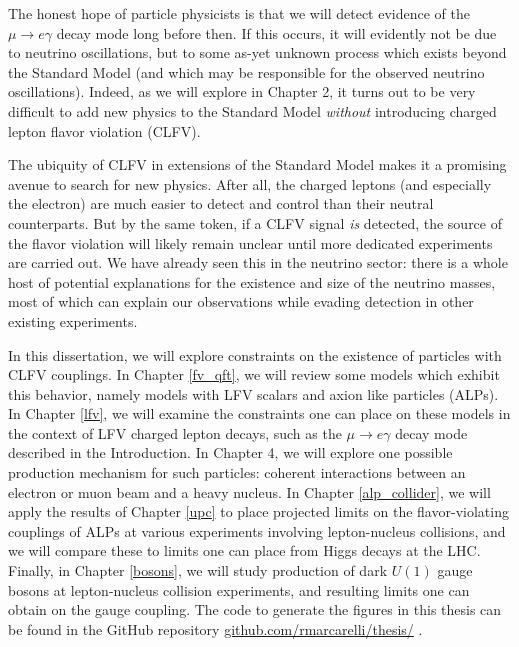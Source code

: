 The honest hope of particle physicists is that we will detect evidence of the $\mu\rightarrow e\gamma$ decay mode long before then. If this occurs, it will evidently not be due to neutrino oscillations, but to some as-yet unknown process which exists beyond the Standard Model (and which may be responsible for the observed neutrino oscillations). Indeed, as we will explore in Chapter 2, it turns out to be very difficult to add new physics to the Standard Model {\it without} introducing charged lepton flavor violation (CLFV). 

The ubiquity of CLFV in extensions of the Standard Model makes it a promising avenue to search for new physics. After all, the charged leptons (and especially the electron) are much easier to detect and control than their neutral counterparts. But by the same token, if a CLFV signal {\it is} detected, the source of the flavor violation will likely remain unclear until more dedicated experiments are carried out. We have already seen this in the neutrino sector: there is a whole host of potential explanations for the existence and size of the neutrino masses, most of which can explain our observations while evading detection in other existing experiments. 

In this dissertation, we will explore constraints on the existence of particles with CLFV couplings. In Chapter \ref{fv_qft}, we will review some models which exhibit this behavior, namely models with LFV scalars and axion like particles (ALPs). In Chapter \ref{lfv}, we will examine the constraints one can place on these models in the context of LFV charged lepton decays, such as the $\mu \rightarrow e\gamma$ decay mode described in the Introduction. In Chapter 4, we will explore one possible production mechanism for such particles: coherent interactions between an electron or muon beam and a heavy nucleus. In Chapter \ref{alp_collider}, we will apply the results of Chapter \ref{upc} to place projected limits on the flavor-violating couplings of ALPs at various experiments involving lepton-nucleus collisions, and we will compare these to limits one can place from Higgs decays at the LHC. Finally, in Chapter \ref{bosons}, we will study production of dark $U(1)$ gauge bosons at lepton-nucleus collision experiments, and resulting limits one can obtain on the gauge coupling. The code to generate the figures in this thesis can be found in the GitHub repository \href{https://github.com/rmarcarelli/thesis/}{github.com/rmarcarelli/thesis/} \cite{MarcarelliGithub2025}.
